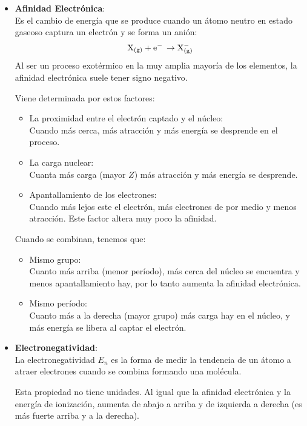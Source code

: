 \documentclass[arial,a4paper,print]{article}
\begin{document}
\begin{itemize}
\item \textbf{Afinidad Electrónica}:\\
Es el cambio de energía que se produce cuando un átomo neutro en estado gaseoso captura un electrón y se forma un anión:
\begin{equation*}
	\ce{X_{(g)} + e^{-} \rightarrow X^{-}_{(g)}}
\end{equation*}
Al ser un proceso exotérmico en la muy amplia mayoría de los elementos, la afinidad electrónica suele tener signo negativo. 

Viene determinada por estos factores:
\begin{itemize}

\item La proximidad entre el electrón captado y el núcleo:\\
Cuando más cerca, más atracción y más energía se desprende en el proceso.

\item La carga nuclear:\\
Cuanta más carga (mayor $Z$) más atracción y más energía se desprende. 

\item Apantallamiento de los electrones:\\
Cuando más lejos este el electrón, más electrones de por medio y menos atracción. Este factor altera muy poco la afinidad. 
\end{itemize}

Cuando se combinan, tenemos que:
\begin{itemize}
\item Mismo grupo: \\
Cuanto más arriba (menor período), más cerca del núcleo se encuentra y menos apantallamiento hay, por lo tanto aumenta la afinidad electrónica. 

\item Mismo período: \\
Cuanto más a la derecha (mayor grupo) más carga hay en el núcleo, y más energía se libera al captar el electrón. 

\end{itemize}

\item \textbf{Electronegatividad}:\\
La electronegatividad $E_{n}$ es la forma de medir la tendencia de un átomo a atraer electrones cuando se combina formando una molécula. 

Esta propiedad no tiene unidades. Al igual que la afinidad electrónica y la energía de ionización, aumenta de abajo a arriba y de izquierda a derecha (es más fuerte arriba y a la derecha). 


\end{itemize}
\end{document}

